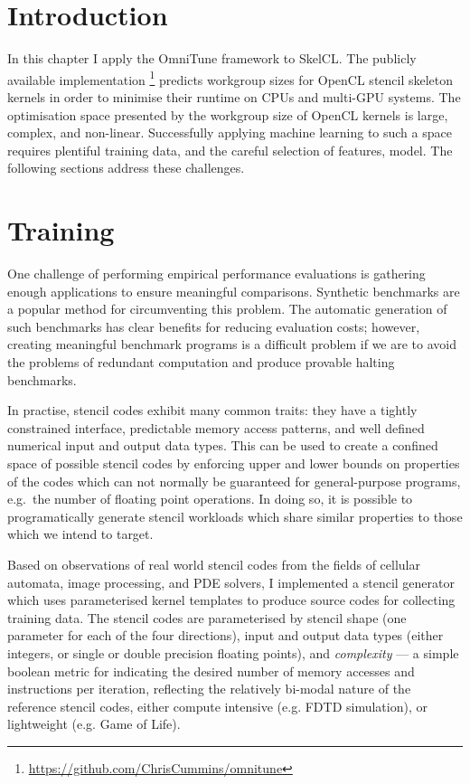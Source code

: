 \section{Introduction}

In this chapter I apply the OmniTune framework to SkelCL. The publicly
available implementation
\footnote{\url{https://github.com/ChrisCummins/omnitune}} predicts
workgroup sizes for OpenCL stencil skeleton kernels in order to
minimise their runtime on CPUs and multi-GPU systems. The optimisation
space presented by the workgroup size of OpenCL kernels is large,
complex, and non-linear. Successfully applying machine learning to
such a space requires plentiful training data, and the careful
selection of features, model. The following sections address these
challenges.



\section{Training}

One challenge of performing empirical performance evaluations is
gathering enough applications to ensure meaningful
comparisons. Synthetic benchmarks are a popular method for
circumventing this problem. The automatic generation of such
benchmarks has clear benefits for reducing evaluation costs; however,
creating meaningful benchmark programs is a difficult problem if we
are to avoid the problems of redundant computation and produce
provable halting benchmarks.

In practise, stencil codes exhibit many common traits: they have a
tightly constrained interface, predictable memory access patterns, and
well defined numerical input and output data types. This can be used
to create a confined space of possible stencil codes by enforcing
upper and lower bounds on properties of the codes which can not
normally be guaranteed for general-purpose programs, e.g.\ the number
of floating point operations. In doing so, it is possible to
programatically generate stencil workloads which share similar
properties to those which we intend to target.

Based on observations of real world stencil codes from the fields of
cellular automata, image processing, and PDE solvers, I implemented a
stencil generator which uses parameterised kernel templates to produce
source codes for collecting training data. The stencil codes are
parameterised by stencil shape (one parameter for each of the four
directions), input and output data types (either integers, or single
or double precision floating points), and \emph{complexity} --- a
simple boolean metric for indicating the desired number of memory
accesses and instructions per iteration, reflecting the relatively
bi-modal nature of the reference stencil codes, either compute
intensive (e.g. FDTD simulation), or lightweight (e.g. Game of Life).

